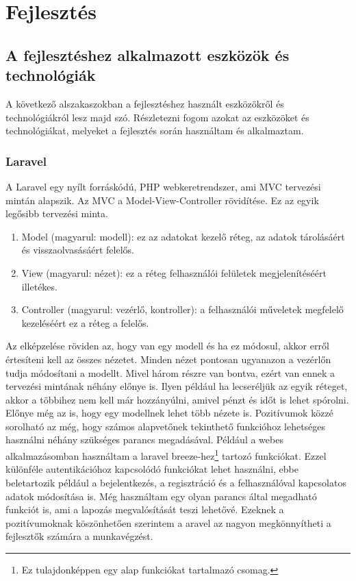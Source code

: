 \documentclass[]{thesis-ekf}
\theoremstyle{definition}
\theoremstyle{remark}
\begin{document}
	\chapter{Fejlesztés}		
	\section{A fejlesztéshez alkalmazott eszközök és technológiák}
		A következő alszakaszokban a fejlesztéshez használt eszközökről és technológiákról lesz majd szó. Részletezni fogom azokat az eszközöket és technológiákat, melyeket a fejlesztés során használtam és alkalmaztam.
	\subsection{Laravel}\label{sc-laravel}
		A Laravel egy nyílt forráskódú, PHP webkeretrendszer, ami MVC tervezési mintán alapszik. Az MVC a Model-View-Controller rövidítése. Ez az egyik legősibb tervezési minta.
		\begin{enumerate}
			\item Model (magyarul: modell): ez az adatokat kezelő réteg, az adatok tárolásáért és visszaolvasásáért felelős.
			\item View (magyarul: nézet): ez a réteg felhasználói felületek megjelenítéséért illetékes. 
			\item Controller (magyarul: vezérlő, kontroller): a felhasználói műveletek megfelelő kezeléséért ez a réteg a felelős.
		\end{enumerate}
		Az elképzelése röviden az, hogy van egy modell és ha ez módosul, akkor erről értesíteni kell az összes nézetet. Minden nézet pontosan ugyanazon a vezérlőn tudja módosítani a modellt. Mivel három részre van bontva, ezért van ennek a tervezési mintának néhány előnye is. Ilyen például ha lecseréljük az egyik réteget, akkor a többihez nem kell már hozzányúlni, amivel pénzt és időt is lehet spórolni. Előnye még az is, hogy egy modellnek lehet több nézete is. Pozitívumok közzé sorolható az még, hogy számos alapvetőnek tekinthető funkcióhoz lehetséges használni néhány szükséges parancs megadásával. Például a webes alkalmazásomban használtam a laravel breeze-hez\footnote{Ez tulajdonképpen egy alap funkciókat tartalmazó csomag.} tartozó funkciókat. Ezzel különféle autentikációhoz kapcsolódó funkciókat lehet használni, ebbe beletartozik például a bejelentkezés, a regisztráció és a felhasználóval kapcsolatos adatok módosítása is. Még használtam egy olyan parancs által megadható funkciót is, ami a lapozás megvalósítását teszi lehetővé. Ezeknek a pozitívumoknak köszönhetően szerintem a aravel az nagyon megkönnyítheti a fejlesztők számára a munkavégzést. 
		\cite{Kusper, Laravel}
\end{document}
